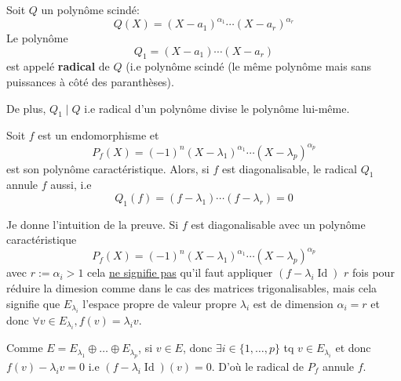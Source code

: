 \begin{definition}
    Soit $Q$ un polynôme scindé:
     \[
         Q(X) = (X - a_1)^{\alpha_1} \cdots (X - a_r)^{\alpha_r}
    \] 
    Le polynôme 
    \[
    Q_1 = (X - a_1) \cdots (X - a_r)
    \] 
    est appelé \textbf{radical} de $Q$ (i.e polynôme scindé (le même polynôme mais sans puissances à côté des paranthèses). 
    \par De plus, $Q_1 \mid Q$ i.e radical d'un polynôme divise le polynôme lui-même.
\end{definition}
\begin{prop}
    Soit $f$ est un endomorphisme et 
     \[
         P_f(X) = (-1)^n(X - \lambda_1)^{\alpha_1} \cdots (X - \lambda_p)^{\alpha_p}
    \] 
    est son polynôme caractéristique. Alors, si $f$ est diagonalisable, le radical  $Q_1$ annule  $f$ aussi, i.e
     \[
    Q_1(f) = (f - \lambda_1) \cdots (f - \lambda_r) = 0
    \] 
\end{prop}
\begin{intuition}
   Je donne l'intuition de la preuve. Si $f$ est diagonalisable avec un polynôme caractéristique
     \[
         P_f(X) = (-1)^n(X - \lambda_1)^{\alpha_1} \cdots (X - \lambda_p)^{\alpha_p}
    \] 
    avec $r := \alpha_i > 1$ cela \underline{ne signifie pas} qu'il faut appliquer $(f - \lambda_i \operatorname{Id})$  $r$ fois pour réduire la dimesion comme dans le cas des matrices trigonalisables, mais cela signifie que  $E_{\lambda_i}$ l'espace propre de valeur propre  $\lambda_i$ est de dimension  $\alpha_i = r$ et donc $\forall v \in E_{\lambda_i}, f(v) = \lambda_i v$. 

    Comme $E = E_{\lambda_1} \oplus \ldots \oplus E_{\lambda_p}$, si $v \in E$, donc $\exists i \in \{1, \ldots, p\}$ tq $v \in E_{\lambda_i}$ et donc $f(v) - \lambda_i v = 0$ i.e  $(f - \lambda_i \operatorname{Id})(v) = 0$. D'où le radical de $P_f$ annule  $f$.
\end{intuition}
